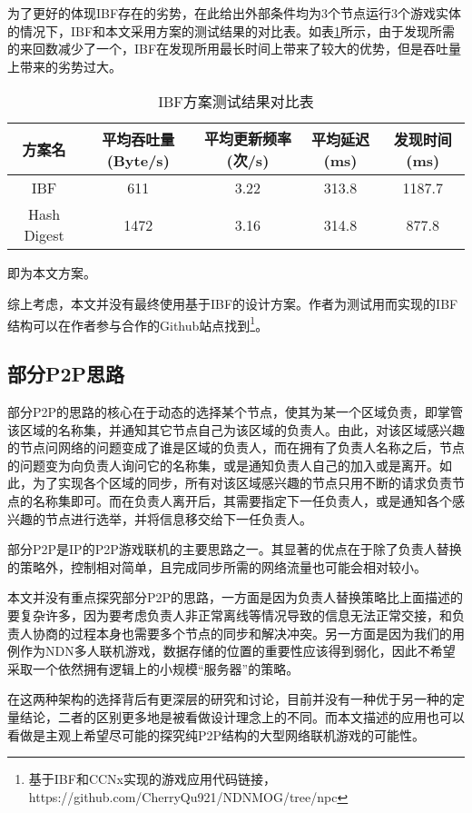 \par
为了更好的体现IBF存在的劣势，在此给出外部条件均为3个节点运行3个游戏实体的情况下，IBF和本文采用方案的测试结果的对比表。如表\ref{tab:IBFComparison}所示，由于发现所需的来回数减少了一个，IBF在发现所用最长时间上带来了较大的优势，但是吞吐量上带来的劣势过大。
\begin{table}[h!]
\centering
\begin{threeparttable}[h]
          \centering
          \caption{IBF方案测试结果对比表}
          \label{tab:IBFComparison}
          \wuhao
          \begin{tabular}{ccccc} \toprule 
		方案名 & 平均吞吐量(Byte/s) & 平均更新频率 (次/s) & 平均延迟 (ms) & 发现时间 (ms)\\ \midrule
          	IBF &    611 &    3.22 &   313.8 &   1187.7 \\ 
		Hash Digest\tnote{1} & 1472 & 3.16 & 314.8 & 877.8 \\ 
\bottomrule
          \end{tabular}
	\begin{tablenotes}
	\item[1] 即为本文方案。
	\end{tablenotes}
	\end{threeparttable}
\end{table}
\par
综上考虑，本文并没有最终使用基于IBF的设计方案。作者为测试用而实现的IBF结构可以在作者参与合作的Github站点找到\footnote{基于IBF和CCNx实现的游戏应用代码链接，https://github.com/CherryQu921/NDNMOG/tree/npc}。
\subsection{部分P2P思路}
\label{PartialP2PSection}
\par
部分P2P的思路的核心在于动态的选择某个节点，使其为某一个区域负责，即掌管该区域的名称集，并通知其它节点自己为该区域的负责人。由此，对该区域感兴趣的节点问网络的问题变成了谁是区域的负责人，而在拥有了负责人名称之后，节点的问题变为向负责人询问它的名称集，或是通知负责人自己的加入或是离开。如此，为了实现各个区域的同步，所有对该区域感兴趣的节点只用不断的请求负责节点的名称集即可。而在负责人离开后，其需要指定下一任负责人，或是通知各个感兴趣的节点进行选举，并将信息移交给下一任负责人。
\par
部分P2P是IP的P2P游戏联机的主要思路之一。其显著的优点在于除了负责人替换的策略外，控制相对简单，且完成同步所需的网络流量也可能会相对较小。
\par
本文并没有重点探究部分P2P的思路，一方面是因为负责人替换策略比上面描述的要复杂许多，因为要考虑负责人非正常离线等情况导致的信息无法正常交接，和负责人协商的过程本身也需要多个节点的同步和解决冲突。另一方面是因为我们的用例作为NDN多人联机游戏，数据存储的位置的重要性应该得到弱化，因此不希望采取一个依然拥有逻辑上的小规模“服务器”的策略。
\par
在这两种架构的选择背后有更深层的研究和讨论，目前并没有一种优于另一种的定量结论，二者的区别更多地是被看做设计理念上的不同。而本文描述的应用也可以看做是主观上希望尽可能的探究纯P2P结构的大型网络联机游戏的可能性。
